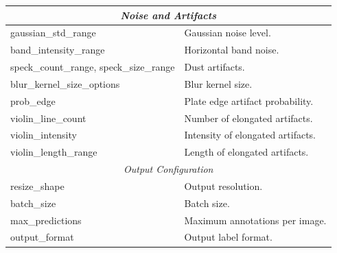 \begin{table}
\begin{tabularx}{\linewidth}{|l|X|}
        \hline
        \multicolumn{2}{|c|}{\textit{Noise and Artifacts}} \\
        \hline
        gaussian\_std\_range & Gaussian noise level. \\
        band\_intensity\_range & Horizontal band noise. \\
        speck\_count\_range, speck\_size\_range & Dust artifacts. \\
        blur\_kernel\_size\_options & Blur kernel size. \\
        prob\_edge & Plate edge artifact probability. \\
        violin\_line\_count & Number of elongated artifacts. \\
        violin\_intensity & Intensity of elongated artifacts. \\
        violin\_length\_range & Length of elongated artifacts. \\

        \hline
        \multicolumn{2}{|c|}{\textit{Output Configuration}} \\
        \hline
        resize\_shape & Output resolution. \\
        batch\_size & Batch size. \\
        max\_predictions & Maximum annotations per image. \\
        output\_format & Output label format. \\

        \hline
    \end{tabularx}
\end{table}

